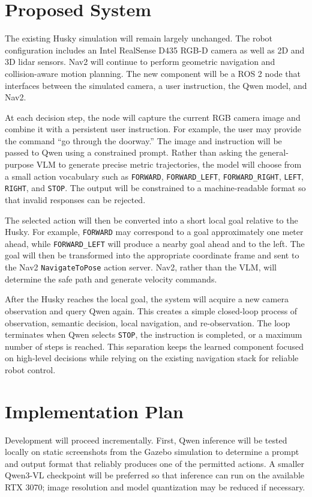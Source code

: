 \documentclass[conference]{IEEEtran}
\begin{document}
\section{Proposed System}
The existing Husky simulation will remain largely unchanged. The robot configuration includes an Intel RealSense D435 RGB-D camera as well as 2D and 3D lidar sensors. Nav2 will continue to perform geometric navigation and collision-aware motion planning. The new component will be a ROS 2 node that interfaces between the simulated camera, a user instruction, the Qwen model, and Nav2.

At each decision step, the node will capture the current RGB camera image and combine it with a persistent user instruction. For example, the user may provide the command ``go through the doorway.'' The image and instruction will be passed to Qwen using a constrained prompt. Rather than asking the general-purpose VLM to generate precise metric trajectories, the model will choose from a small action vocabulary such as \texttt{FORWARD}, \texttt{FORWARD\_LEFT}, \texttt{FORWARD\_RIGHT}, \texttt{LEFT}, \texttt{RIGHT}, and \texttt{STOP}. The output will be constrained to a machine-readable format so that invalid responses can be rejected.

The selected action will then be converted into a short local goal relative to the Husky. For example, \texttt{FORWARD} may correspond to a goal approximately one meter ahead, while \texttt{FORWARD\_LEFT} will produce a nearby goal ahead and to the left. The goal will then be transformed into the appropriate coordinate frame and sent to the Nav2 \texttt{NavigateToPose} action server. Nav2, rather than the VLM, will determine the safe path and generate velocity commands.

After the Husky reaches the local goal, the system will acquire a new camera observation and query Qwen again. This creates a simple closed-loop process of observation, semantic decision, local navigation, and re-observation. The loop terminates when Qwen selects \texttt{STOP}, the instruction is completed, or a maximum number of steps is reached. This separation keeps the learned component focused on high-level decisions while relying on the existing navigation stack for reliable robot control.

\section{Implementation Plan}
Development will proceed incrementally. First, Qwen inference will be tested locally on static screenshots from the Gazebo simulation to determine a prompt and output format that reliably produces one of the permitted actions. A smaller Qwen3-VL checkpoint will be preferred so that inference can run on the available RTX 3070; image resolution and model quantization may be reduced if necessary.
\end{document}
